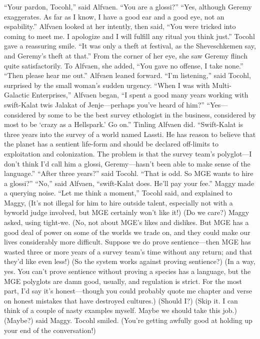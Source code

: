 \documentclass[9pt]{article}
\begin{document}
“Your pardon, Tocohl,” said Alfvaen. “You are a glossi?”
“Yes, although Geremy exaggerates. As far as I know, I have a good ear and a good eye, not an
espability.”
Alfvaen looked at her intently, then said, “You were tricked into coming to meet me. I apologize and
I will fulfill any ritual you think just.”
Tocohl gave a reassuring smile. “It was only a theft at festival, as the Sheveschkemen say, and
Geremy’s theft at that.” From the corner of her eye, she saw Geremy flinch quite satisfactorily. To
Alfvaen, she added, “You gave no offense, I take none.”
“Then please hear me out.” Alfvaen leaned forward.
“I’m listening,” said Tocohl, surprised by the small woman’s sudden urgency.
“When I was with Multi-Galactic Enterprises,” Alfvaen began, “I spent a good many years working
with swift-Kalat twis Jalakat of Jenje—perhaps you’ve heard of him?”
“Yes—considered by some to be the best survey ethologist in the business, considered by most to
be ‘crazy as a Hellspark.’ Go on.”
Tinling Alfvaen did. “Swift-Kalat is three years into the survey of a world named Lassti. He has
reason to believe that the planet has a sentient life-form and should be declared off-limits to exploitation
and colonization. The problem is that the survey team’s polyglot—I don’t think I’d call him a glossi,
Geremy—hasn’t been able to make sense of the language.”
“After three years?” said Tocohl. “That is odd. So MGE wants to hire a glossi?”
“No,” said Alfvaen, “swift-Kalat does. He’ll pay your fee.”
Maggy made a querying noise.
“Let me think a moment,” Tocohl said, and explained to Maggy, (It’s not illegal for him to hire
outside talent, especially not with a byworld judge involved, but MGE certainly won’t like it!)
(Do we care?) Maggy asked, using tight-we.
(No, not about MGE’s likes and dislikes. But MGE has a good deal of power on some of the worlds
we trade on, and they could make our lives considerably more difficult. Suppose we do prove
sentience—then MGE has wasted three or more years of a survey team’s time without any return; and
that they’d like even less!)
(So the system works against proving sentience?)
(In a way, yes. You can’t prove sentience without proving a species has a language, but the MGE
polyglots are damn good, usually, and regulation is strict. For the most part, I’d say it’s honest—though
you could probably quote me chapter and verse on honest mistakes that have destroyed cultures.)
(Should I?)
(Skip it. I can think of a couple of nasty examples myself. Maybe we should take this job.)
(Maybe?) said Maggy.
Tocohl smiled. (You’re getting awfully good at holding up your end of the conversation!)
\end{document}

